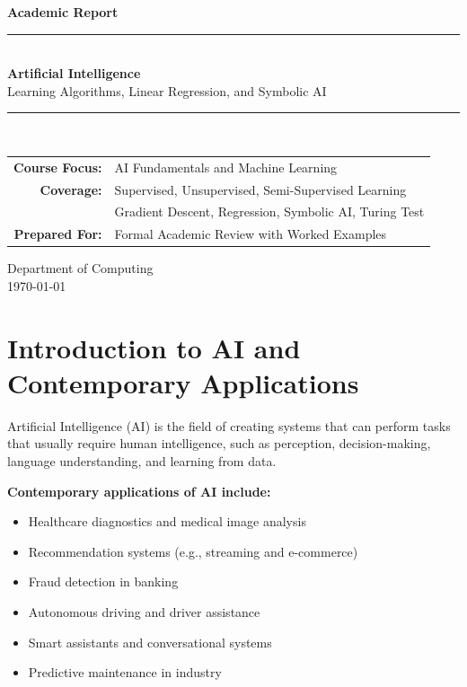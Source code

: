 \documentclass[12pt,a4paper]{article}
\begin{document}
\begin{titlepage}
\centering
\vspace*{0.7cm}
{\Large\color{primary}\textbf{Academic Report}}\\[0.3cm]
\rule{\textwidth}{1.6pt}\\[0.5cm]
{\Huge\bfseries\color{primary}Artificial Intelligence}\\[0.2cm]
{\Large Learning Algorithms, Linear Regression, and Symbolic AI}\\[0.4cm]
\rule{\textwidth}{1.6pt}\\[0.9cm]

\begin{tabular}{rl}
\textbf{Course Focus:} & AI Fundamentals and Machine Learning \\
\textbf{Coverage:} & Supervised, Unsupervised, Semi-Supervised Learning \\
\textbf{} & Gradient Descent, Regression, Symbolic AI, Turing Test \\
\textbf{Prepared For:} & Formal Academic Review with Worked Examples
\end{tabular}

\vfill
{\large Department of Computing}\\
{\large \today}
\end{titlepage}

\tableofcontents
\newpage

\section{\textcolor{primary}{Introduction to AI and Contemporary Applications}}

Artificial Intelligence (AI) is the field of creating systems that can perform tasks that usually require human intelligence, such as perception, decision-making, language understanding, and learning from data.

\textbf{Contemporary applications of AI include:}
\begin{itemize}[noitemsep]
    \item Healthcare diagnostics and medical image analysis
    \item Recommendation systems (e.g., streaming and e-commerce)
    \item Fraud detection in banking
    \item Autonomous driving and driver assistance
    \item Smart assistants and conversational systems
    \item Predictive maintenance in industry
\end{itemize}
\end{document}
